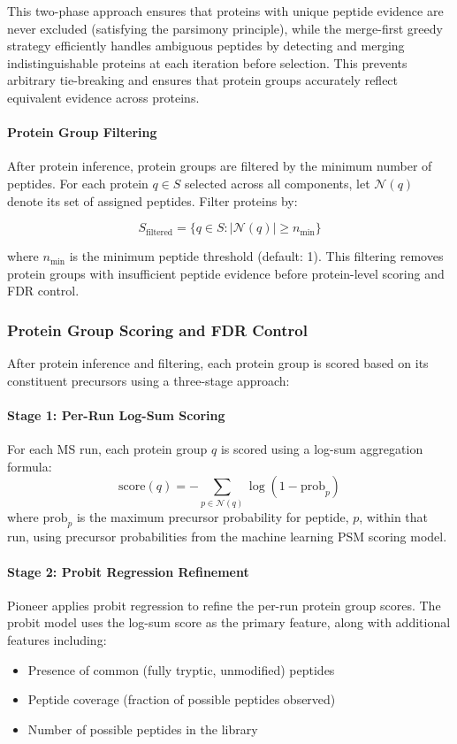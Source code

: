 \documentclass{article}
\begin{document}
This two-phase approach ensures that proteins with unique peptide evidence are never excluded (satisfying the parsimony principle), while the merge-first greedy strategy efficiently handles ambiguous peptides by detecting and merging indistinguishable proteins at each iteration before selection. This prevents arbitrary tie-breaking and ensures that protein groups accurately reflect equivalent evidence across proteins.

\paragraph{Protein Group Filtering} After protein inference, protein groups are filtered by the minimum number of peptides. For each protein $q \in S$ selected across all components, let $\mathcal{N}(q)$ denote its set of assigned peptides. Filter proteins by:

\begin{equation}
S_{\text{filtered}} = \{q \in S : |\mathcal{N}(q)| \geq n_{\text{min}}\}
\end{equation}

where $n_{\text{min}}$ is the minimum peptide threshold (default: 1). This filtering removes protein groups with insufficient peptide evidence before protein-level scoring and FDR control.

\subsubsection{Protein Group Scoring and FDR Control}

After protein inference and filtering, each protein group is scored based on its constituent precursors using a three-stage approach:

\paragraph{Stage 1: Per-Run Log-Sum Scoring} For each MS run, each protein group $q$ is scored using a log-sum aggregation formula:
\begin{equation}
\text{score}(q) = -\sum_{p \in \mathcal{N}(q)} \log(1 - \text{prob}_p)
\end{equation}
where $\text{prob}_p$ is the maximum precursor probability for peptide, $p$, within that run, using precursor probabilities from the machine learning PSM scoring model.

\paragraph{Stage 2: Probit Regression Refinement} Pioneer applies probit regression to refine the per-run protein group scores. The probit model uses the log-sum score as the primary feature, along with additional features including:
\begin{itemize}
  \item Presence of common (fully tryptic, unmodified) peptides
  \item Peptide coverage (fraction of possible peptides observed)
  \item Number of possible peptides in the library
\end{itemize}
\end{document}
